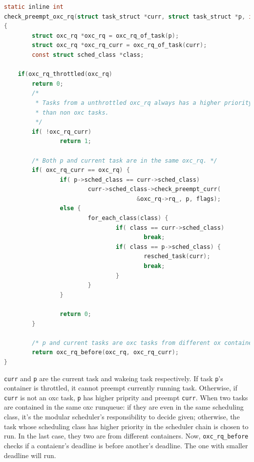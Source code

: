 \begin{lstlisting}[language=C, label={check_preempt}]
static inline int
check_preempt_oxc_rq(struct task_struct *curr, struct task_struct *p, int flags)
{
        struct oxc_rq *oxc_rq = oxc_rq_of_task(p);
        struct oxc_rq *oxc_rq_curr = oxc_rq_of_task(curr);
        const struct sched_class *class;

	if(oxc_rq_throttled(oxc_rq)
		return 0;
        /* 
         * Tasks from a unthrottled oxc_rq always has a higher priority 
         * than non oxc tasks.
         */
        if( !oxc_rq_curr)
                return 1;

        /* Both p and current task are in the same oxc_rq. */
        if( oxc_rq_curr == oxc_rq) {
                if( p->sched_class == curr->sched_class) 
                        curr->sched_class->check_preempt_curr(
                                      &oxc_rq->rq_, p, flags);
                else {
                        for_each_class(class) {
                                if( class == curr->sched_class)
                                        break;
                                if( class == p->sched_class) {
                                        resched_task(curr);
                                        break;
                                }
                        }
                }

                return 0;
        }

        /* p and current tasks are oxc tasks from different ox containers. */
        return oxc_rq_before(oxc_rq, oxc_rq_curr);
}
\end{lstlisting}
\texttt{curr} and \texttt{p} are the current task and wakeing task respectively.
If task \texttt{p}'s container is throttled, it cannot preempt currently running task.
Otherwise, if \texttt{curr} is not an oxc task, \texttt{p} has higher priprity and
preempt \texttt{curr}. When two tasks are contained in the same oxc runqueue: if 
they are even in the same scheduling class, it's the modular scheduler's responsibility
to decide given; otherwise, the task whose scheduling class has higher priority in the
scheduler chain is chosen to run. In the last case, they two are from different 
containers. Now, \texttt{oxc\_rq\_before} checks if a contaienr's deadline is before
another's deadline. The one with smaller deadline will run. 

